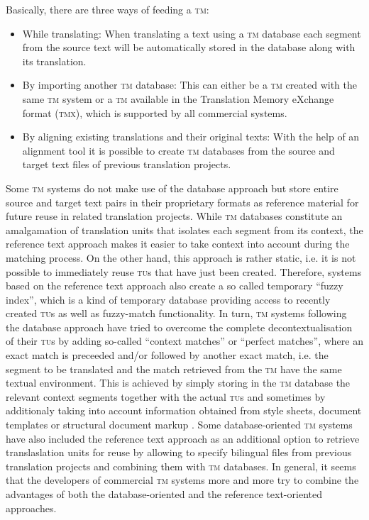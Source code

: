 \documentclass[output=paper]{LSP/langsci}
\begin{document}
Basically, there are three ways of feeding a \textsc{tm}:

\begin{itemize}
\item 
While translating: When translating a text using a \textsc{tm} database each segment from the source text will be automatically stored in the database along with its translation.
\item 
By importing another \textsc{tm} database: This can either be a \textsc{tm} created with the same \textsc{tm} system or a \textsc{tm} available in the Translation Memory eXchange format (\textsc{tmx}), which is supported by all commercial systems.
\item 
By aligning existing translations and their original texts: With the help of an alignment tool it is possible to create \textsc{tm} databases from the source and target text files of previous translation projects.
\end{itemize}

Some \textsc{tm} systems do not make use of the database approach but store entire source and target text pairs in their proprietary formats as reference material for future reuse in related translation projects. While \textsc{tm} databases constitute an amalgamation of translation units that isolates each segment from its context, the reference text approach makes it easier to take context into account during the matching process. On the other hand, this approach is rather static, i.e. it is not possible to immediately reuse \textsc{tu}s that have just been created. Therefore, systems based on the reference text approach also create a so called temporary ``fuzzy index'', which is a kind of temporary database providing access to recently created \textsc{tu}s as well as fuzzy-match functionality. In turn, \textsc{tm} systems following the database approach have tried to overcome the complete decontextualisation of their \textsc{tu}s by adding so-called ``context matches'' or ``perfect matches'', where an exact match is preceeded and/or followed by another exact match, i.e. the segment to be translated and the match retrieved from the \textsc{tm} have the same textual environment. This is achieved by simply storing in the \textsc{tm} database the relevant context segments together with the actual \textsc{tu}s and sometimes by additionaly taking into account information obtained from style sheets, document templates or structural document markup \citep{Chama2010}. Some database-oriented \textsc{tm} systems have also included the reference text approach as an additional option to retrieve translaslation units for reuse by allowing to specify bilingual files from previous translation projects and combining them with \textsc{tm} databases. In general, it seems that the developers of commercial \textsc{tm} systems more and more try to combine the advantages of both the database-oriented and the reference text-oriented approaches.
\end{document}
